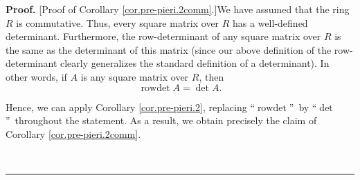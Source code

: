 \documentclass
[numbers=enddot,12pt,final,onecolumn,notitlepage,english]{scrartcl}%
\theoremstyle{definition}
\newenvironment{proof}[1][Proof]{\noindent\textbf{#1.} }{\ \rule{0.5em}{0.5em}}
\newenvironment{vershort}{}{}
\begin{document}
\begin{proof}
[Proof of Corollary \ref{cor.pre-pieri.2comm}.]We have assumed that the ring
$R$ is commutative. Thus, every square matrix over $R$ has a well-defined
determinant. Furthermore, the row-determinant of any square matrix over $R$ is
the same as the determinant of this matrix (since our above definition of the
row-determinant clearly generalizes the standard definition of a determinant).
In other words, if $A$ is any square matrix over $R$, then%
\begin{equation}
\operatorname*{rowdet}A=\det A. \label{pf.cor.pre-pieri.2comm.rd=d}%
\end{equation}


\begin{vershort}
Hence, we can apply Corollary \ref{cor.pre-pieri.2}, replacing
\textquotedblleft$\operatorname*{rowdet}$\textquotedblright\ by
\textquotedblleft$\det$\textquotedblright\ throughout the statement. As a
result, we obtain precisely the claim of Corollary \ref{cor.pre-pieri.2comm}.
\qedhere

\end{vershort}


\end{proof}
\end{document}
